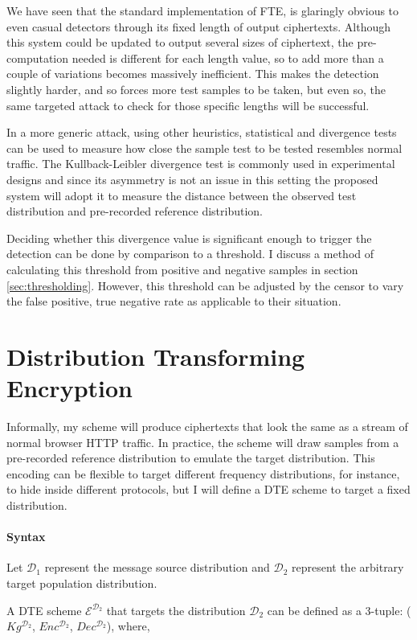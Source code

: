 \documentclass[ %
                    author={Samuel Russell},
                supervisor={Prof. Bogdan Warinschi},
                    degree={MEng},
                     title={Innocuous Ciphertexts},
                  subtitle={The DE-CENSOR Scheme},
                      type={research},
                      year={2018} ]{dissertation}
\begin{document}
We have seen that the standard implementation of FTE, is glaringly obvious to even casual detectors through its fixed length of output ciphertexts.
Although this system could be updated to output several sizes of ciphertext, the pre-computation needed is different for each length value, so to add more than a couple of variations becomes massively inefficient.
This makes the detection slightly harder, and so forces more test samples to be taken, but even so, the same targeted attack to check for those specific lengths will be successful.

In a more generic attack, using other heuristics, statistical and divergence tests can be used to measure how close the sample test to be tested resembles normal traffic.
The Kullback-Leibler divergence test is commonly used in experimental designs and since its asymmetry is not an issue in this setting the proposed system will adopt it to measure the distance between the observed test distribution and pre-recorded reference distribution.

Deciding whether this divergence value is significant enough to trigger the detection can be done by comparison to a threshold.
I discuss a method of calculating this threshold from positive and negative samples in section \ref{sec:thresholding}. However, this threshold can be adjusted by the censor to vary the false positive, true negative rate as applicable to their situation.


\chapter{Distribution Transforming Encryption}\label{sec:dte}

Informally, my scheme will produce ciphertexts that look the same as a stream of normal browser HTTP traffic.
In practice, the scheme will draw samples from a pre-recorded reference distribution to emulate the target distribution.
This encoding can be flexible to target different frequency distributions, for instance, to hide inside different protocols, but I will define a DTE scheme to target a fixed distribution.

\subsubsection{Syntax}
Let $\mathcal{D}_1$ represent the message source distribution and $\mathcal{D}_2$ represent the arbitrary target population distribution.


A DTE scheme $\mathcal{E}^{\mathcal{D}_2}$ that targets the distribution $\mathcal{D}_2$ can be defined as a 3-tuple: ($Kg^{\mathcal{D}_2}$, $Enc^{\mathcal{D}_2}$, $Dec^{\mathcal{D}_2}$), where,
\end{document}
